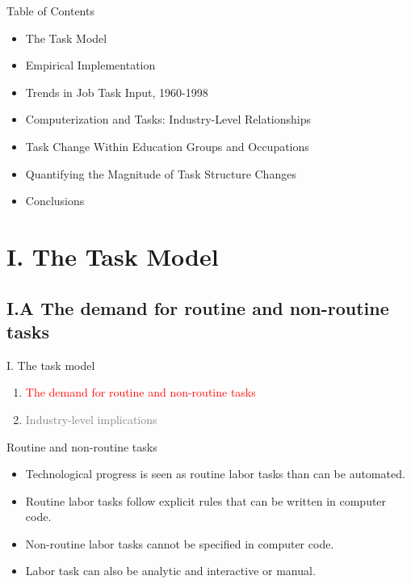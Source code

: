 \documentclass[notes=show]{beamer}
\begin{document}
\begin{frame}{Table of Contents}
\begin{itemize}
\item[I.] The Task Model \smallskip
\item[II.] Empirical Implementation \smallskip
\item[III.] Trends in Job Task Input, 1960-1998 \smallskip
\item[IV.] Computerization and Tasks: Industry-Level Relationships \smallskip
\item[V.] Task Change Within Education Groups and Occupations \smallskip
\item[VI.] Quantifying the Magnitude of Task Structure Changes \smallskip
\item[VII.] Conclusions
\end{itemize}
\end{frame}

\section{I. The Task Model}

\subsection{I.A The demand for routine and non-routine tasks}

\begin{frame}{I. The task model}
\begin{enumerate}
\item[\textcolor{red}{I.A}] \textcolor{red}{The demand for routine and non-routine tasks} \bigskip
\item[\textcolor{gray}{I.B}] \textcolor{gray}{Industry-level implications}
\end{enumerate}
\end{frame}

\begin{frame}{Routine and non-routine tasks}
\begin{itemize}
\item Technological progress is seen as routine labor tasks than can be automated.\medskip
\item Routine labor tasks follow explicit rules that can be written in computer code.\medskip
\item Non-routine labor tasks cannot be specified in computer code.\medskip
\item Labor task can also be analytic and interactive or manual.
\end{itemize}
\end{frame}
\end{document}
